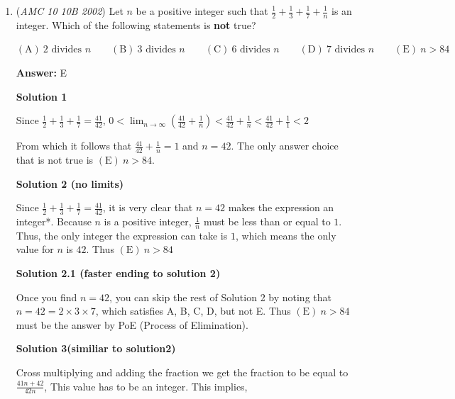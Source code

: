 \begin{enumerate}
 



\textbf{Solution 2}

Considering parity, we see that $n^2 - 3n + 2$ is always even.  The only even prime is $2$, and so $n^2-3n=0$ whence $n=3\Rightarrow\boxed{\mathrm{(B)}\ \text{one}}$.

 


	\item (\textit{AMC 10 10B 2002}) Let $n$ be a positive integer such that $\frac{1}{2}+\frac{1}{3}+\frac{1}{7}+\frac{1}{n}$ is an integer. Which of the following statements is \textbf{not} true?


 $\mathrm{(A) \ } 2\text{ divides }n\qquad \mathrm{(B) \ } 3\text{ divides }n\qquad \mathrm{(C) \ } 6\text{ divides }n\qquad \mathrm{(D) \ } 7\text{ divides }n\qquad \mathrm{(E) \ } n>84$

 \textbf{Answer: }E



\textbf{Solution 1}

Since $\frac 12 + \frac 13 + \frac 17  = \frac {41}{42}$, $0 < \lim_{n \rightarrow \infty} \left(\frac{41}{42} + \frac{1}{n}\right) < \frac {41}{42} + \frac 1n < \frac{41}{42} + \frac 11 < 2$

 From which it follows that $\frac{41}{42} + \frac 1n = 1$ and $n = 42$. The only answer choice that is not true is $\boxed{\mathrm{(E)}\ n>84}$.

 



\textbf{Solution 2 (no limits)}

Since $\frac 12 + \frac 13 + \frac 17  = \frac {41}{42}$, it is very clear that $n=42$ makes the expression an integer*. Because $n$ is a positive integer, $\frac{1}{n}$ must be less than or equal to $1$. Thus, the only integer the expression can take is $1$, which means the only value for $n$ is $42$. Thus $\boxed{\mathrm{(E)}\ n>84}$




\textbf{Solution 2.1 (faster ending to solution 2)}

Once you find $n=42$, you can skip the rest of Solution 2 by noting that $n=42=2\times3\times7$, which satisfies A, B, C, D, but not E. Thus $\boxed{\mathrm{(E)}\ n>84}$ must be the answer by PoE (Process of Elimination).

 



\textbf{Solution 3(similiar to solution2)}

Cross multiplying and adding the fraction we get the fraction to be equal to $\frac {41n + 42}{42n}$, This value has to be an integer. This implies,


\end{enumerate}

